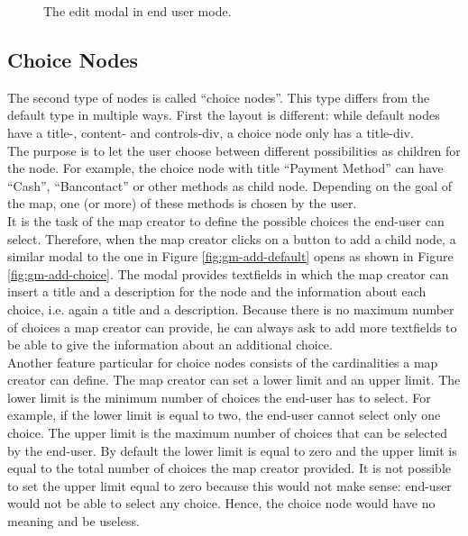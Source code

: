\begin{figure}[H]
	\centering
	\caption{The edit modal in end user mode.}
	\label{fig:gm-editmodal-enduser}
\end{figure}





\subsection{Choice Nodes}
The second type of nodes is called ``choice nodes''. This type differs from the default type in multiple ways. First the layout is different: while default nodes have a title-, content- and controls-div, a choice node only has a title-div.\\

The purpose is to let the user choose between different possibilities as children for the node. For example, the choice node with title ``Payment Method'' can have ``Cash'', ``Bancontact'' or other methods as child node. Depending on the goal of the map, one (or more) of these methods is chosen by the user.\\

It is the task of the map creator to define the possible choices the end-user can select. Therefore, when the map creator clicks on a button to add a child node, a similar modal to the one in Figure \ref{fig:gm-add-default} opens as shown in Figure \ref{fig:gm-add-choice}. The modal provides textfields in which the map creator can insert a title and a description for the node and the information about each choice, i.e. again a title and a description. Because there is no maximum number of choices a map creator can provide, he can always ask to add more textfields to be able to give the information about an additional choice.\\

Another feature particular for choice nodes consists of the cardinalities a map creator can define. The map creator can set a lower limit and an upper limit. The lower limit is the minimum number of choices the end-user has to select. For example, if the lower limit is equal to two, the end-user cannot select only one choice. The upper limit is the maximum number of choices that can be selected by the end-user. By default the lower limit is equal to zero and the upper limit is equal to the total number of choices the map creator provided. It is not possible to set the upper limit equal to zero because this would not make sense: end-user would not be able to select any choice. Hence, the choice node would have no meaning and be useless.

